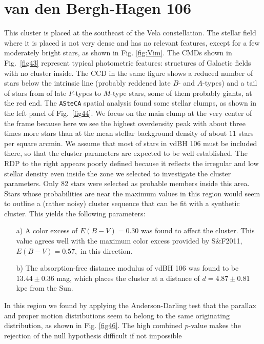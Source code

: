 \documentclass[draft]{aa}
\begin{document}
\section{van den Bergh-Hagen 106}

This cluster is placed at the southeast of the Vela constellation. The stellar field where it is placed is not very dense and has no relevant features, except for a few
moderately bright stars, as shown in Fig. \ref{fig:Vim}.
The CMDs shown in Fig.~\ref{fig43} represent typical photometric features:
structures of Galactic fields with no cluster inside. The CCD in the
same figure shows a reduced number of stars below the intrinsic line 
(probably reddened late $B$- and $A$-types) and a tail of stars from of late
$F$-types to $M$-type stars, some of them probably giants, at the red end.
The %
\texttt{ASteCA} spatial analysis found some stellar clumps, as shown in the left panel of
Fig.~\ref{fig44}. We focus on the main clump at the very
center of the frame because here we see the highest overdensity peak with
$\text{about three}$ times more stars than at the mean stellar background density of
$\text{about }11$ stars per square arcmin.
We assume that most of stars in vdBH 106 must be included there, so that the cluster
parameters are expected to be well established. The RDP to the right appears poorly
defined because it reflects the irregular and low stellar density even inside the
zone we selected to investigate the cluster parameters.
Only 82 stars were selected as probable members inside this area.
Stars whose probabilities are near the maximum values in this region would
seem to outline a (rather noisy) cluster sequence that can be fit with a
synthetic cluster. This yields the following parameters:

\begin{itemize}
\item [a)] A color excess of $E(B-V)=0.30$ was found to affect the
cluster. This value agrees well with the maximum color excess provided
by S\&F2011, $E(B-V)=0.57,$ in this direction.
\item [b)] The absorption-free distance modulus of vdBH 106 was found to be
$13.44\pm0.36$ mag, which places the cluster at a distance of
$d=4.87\pm0.81$ kpc from the Sun.
\end{itemize}

In this region we found by applying the Anderson-Darling test that
the parallax and proper motion distributions seem to belong to the same
originating distribution, as shown in Fig. \ref{fig46}. The
high combined $p$-value makes the rejection of the null hypothesis difficult
if not impossible\\
\end{document}
